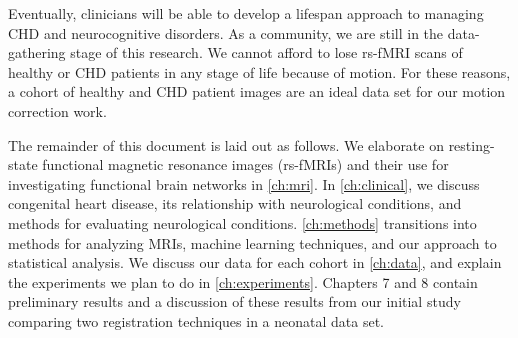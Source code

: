 Eventually, clinicians will be able to develop a lifespan approach to managing CHD and neurocognitive disorders. As a community, we are still in the data-gathering stage of this research. We cannot afford to lose rs-fMRI scans of healthy or CHD patients in any stage of life because of motion. For these reasons, a cohort of healthy and CHD patient images are an ideal data set for our motion correction work. 




The remainder of this document is laid out as follows. We elaborate on resting-state functional magnetic resonance images (rs-fMRIs) and their use for investigating functional brain networks in \autoref{ch:mri}. In \autoref{ch:clinical}, we discuss congenital heart disease, its relationship with neurological conditions, and methods for evaluating neurological conditions. \autoref{ch:methods} transitions into methods for analyzing MRIs, machine learning techniques, and our approach to statistical analysis. We discuss our data for each cohort in \autoref{ch:data}, and explain the experiments we plan to do in \autoref{ch:experiments}. 
Chapters 7 and 8 contain preliminary results and a discussion of these results from our initial study comparing two registration techniques in a neonatal data set.